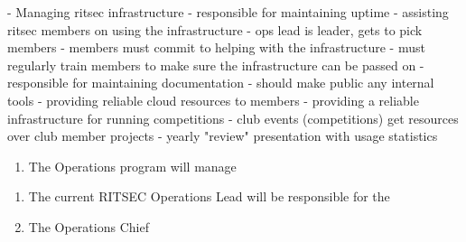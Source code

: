 
- Managing ritsec infrastructure
- responsible for maintaining uptime
- assisting ritsec members on using the infrastructure
- ops lead is leader, gets to pick members
- members must commit to helping with the infrastructure
- must regularly train members to make sure the infrastructure can be passed on
- responsible for maintaining documentation
- should make public any internal tools
- providing reliable cloud resources to members
- providing a reliable infrastructure for running competitions
- club events (competitions) get resources over club member projects
- yearly "review" presentation with usage statistics


\begin{enumerate}
    \item The Operations program will manage
\end{enumerate}


\begin{enumerate}
    \item The current RITSEC Operations Lead will be responsible for the 
    \item The Operations Chief
\end{enumerate}


\begin{enumerate}
\end{enumerate}